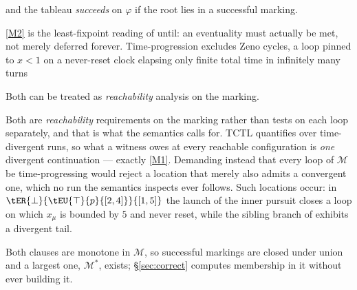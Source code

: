 \noindent
and the tableau \emph{succeeds} on $\varphi$ if the root lies in a successful marking.

\ref{M2} is the least-fixpoint reading of until: an eventuality must actually be met, not merely
deferred forever. Time-progression excludes Zeno cycles, a loop pinned to $x<1$ on a never-reset
clock elapsing only finite total time in infinitely many turns


Both can be treated as \emph{reachability} analysis on the marking. 

Both are \emph{reachability} requirements on the marking rather than tests on each loop separately,
and that is what the semantics calls for. TCTL quantifies over time-divergent runs, so what a
witness owes at every reachable configuration is \emph{one} divergent continuation --- exactly
\ref{M1}. Demanding instead that every loop of $\mathcal M$ be time-progressing would reject a
location that merely also admits a convergent one, which no run the semantics inspects ever
follows. Such locations occur: in $\tER{\bot}{\tEU{\top}{p}{[2,4]}}{[1,5]}$ the launch of the inner
pursuit closes a loop on which $x_\mu$ is bounded by $5$ and never reset, while the sibling
 branch of  exhibits a divergent tail.

Both clauses are monotone in $\mathcal M$, so successful markings are closed under union and a
largest one, $\mathcal M^{*}$, exists; \S\ref{sec:correct} computes membership in it without ever
building it.


